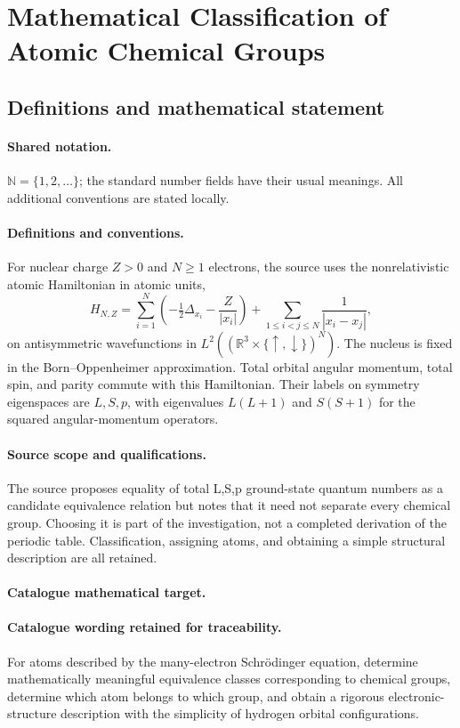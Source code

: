 \documentclass[11pt]{article}
\begin{document}
\section{Mathematical Classification of Atomic Chemical Groups}\label{statement}

\subsection{Definitions and mathematical statement}

\paragraph{Shared notation.}$\mathbb N=\{1,2,\ldots\}$; the standard number fields have their usual meanings. All additional conventions are stated locally.


\paragraph{Definitions and conventions.} For nuclear charge $Z>0$ and $N\ge1$ electrons, the source uses the nonrelativistic atomic Hamiltonian in atomic units,
\[
H_{N,Z}=\sum_{i=1}^N\left(-\tfrac12\Delta_{x_i}-\frac{Z}{|x_i|}\right)+
\sum_{1\le i<j\le N}\frac1{|x_i-x_j|},
\]
on antisymmetric wavefunctions in $L^2((\mathbb R^3\times\{\uparrow,\downarrow\})^N)$. The nucleus is fixed in the Born--Oppenheimer approximation. Total orbital angular momentum, total spin, and parity commute with this Hamiltonian. Their labels on symmetry eigenspaces are $L,S,p$, with eigenvalues $L(L+1)$ and $S(S+1)$ for the squared angular-momentum operators.

\paragraph{Source scope and qualifications.} The source proposes equality of total L,S,p ground-state quantum numbers as a candidate equivalence relation but notes that it need not separate every chemical group. Choosing it is part of the investigation, not a completed derivation of the periodic table. Classification, assigning atoms, and obtaining a simple structural description are all retained.

\paragraph{Catalogue mathematical target.}
\paragraph{Catalogue wording retained for traceability.}
For atoms described by the many-electron Schrödinger equation, determine mathematically meaningful equivalence classes corresponding to chemical groups, determine which atom belongs to which group, and obtain a rigorous electronic-structure description with the simplicity of hydrogen orbital configurations.
\end{document}
